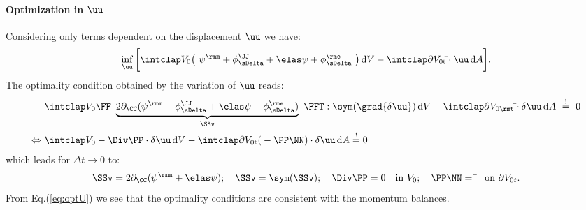 \paragraph{Optimization in $\uu$} \label{sec:optU}%
Considering only terms dependent on the displacement $\uu$ we have:
\begin{align}
  \inf_\uu \bigg[ \intVO \big(\ \psim+\phiJJDelta+\psie+\phieDelta \ \big) \dV - \intdVOx{t} \bar\tt \cdot \uu \dA \bigg].
\end{align}
The optimality condition obtained by the variation of $\uu$ reads:
\begin{align}
  \begin{split}
    &\intVO \FF \ \underbrace{2\dCC(\psim+\phiJJDelta+\psie+\phieDelta)}_{\SSv} \ \FFT: \sym(\grad{\delta\uu}) \dV - \intdVOt \bar\tt \cdot \delta \uu \dA \ \stackrel{!}{=} \ 0 \\
    \Leftrightarrow \ &\intVO -\Div\PP \cdot \delta \uu \dV - \intdVOx{t} (\bar\tt-\PP\NN) \cdot \delta\uu \dA \stackrel{!}{=} 0
  \end{split}
\end{align}
which leads for $\Delta t \rightarrow 0$ to:
\begin{align}
    \SSv=2\dCC(\psim+\psie); \quad \SSv=\sym(\SSv); \quad \Div\PP=0 \quad \text{in} \ V_0; \quad \PP\NN = \bar\tt \quad \text{on} \ \partial V_{0t}.
    \label{eq:optU}
\end{align}
From Eq.(\ref{eq:optU}) we see that the optimality conditions are consistent with the momentum balances.


